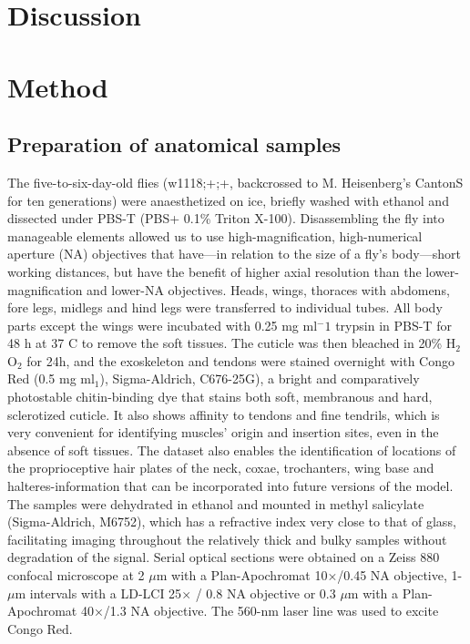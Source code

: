 \documentclass[sn-mathphys-num]{sn-jnl}%
\theoremstyle{thmstyleone}%
\theoremstyle{thmstyletwo}%
\theoremstyle{thmstylethree}%
\begin{document}
\section{Discussion}

\section{Method} \label{sec:method}

\subsection{Preparation of anatomical samples}

The five-to-six-day-old flies (w1118;+;+, backcrossed to M. Heisenberg's CantonS for ten generations) were anaesthetized on ice, briefly washed with ethanol and dissected under PBS-T (PBS+ 0.1\% Triton X-100).
Disassembling the fly into manageable elements allowed us to use high-magnification, high-numerical aperture (NA) objectives that have—in relation to the size of a fly’s body—short working distances, but have the benefit of higher axial resolution than the lower-magnification and lower-NA objectives. 
Heads, wings, thoraces with abdomens, fore legs, midlegs and hind legs were transferred to individual tubes.
All body parts except the wings 
were incubated with 0.25 mg ml$ ^-1 $ trypsin in PBS-T for 48 h at 37 C to remove the soft tissues.
The cuticle was then bleached in 20\% H$ _2 $O$ _2 $ for 24h, and the exoskeleton and tendons were stained overnight with Congo Red (0.5 mg ml$ _1 $), Sigma-Aldrich, C676-25G), a bright and comparatively photostable chitin-binding dye that stains both soft, membranous and hard, sclerotized cuticle.
It also shows affinity to tendons and fine tendrils, which is very convenient for identifying muscles' origin and insertion sites, even in the absence of soft tissues.
The dataset also enables the identification of locations of the proprioceptive hair plates of the neck, coxae, trochanters, wing base and halteres-information that can be incorporated into future versions of the model. 
The samples were dehydrated in ethanol and mounted in methyl salicylate (Sigma-Aldrich, M6752), which has a refractive index very close to that of glass, facilitating imaging throughout the relatively thick and bulky samples without degradation of the signal. 
Serial optical sections were obtained on a Zeiss 880 confocal microscope at 2 $ \mu $m with a Plan-Apochromat 10×/0.45 NA objective, 1-$ \mu $m intervals with a LD-LCI 25$ \times $ / 0.8 NA objective or 0.3 $ \mu $m with a Plan-Apochromat 40×/1.3 NA objective. The 560-nm laser line was used to excite Congo Red.
\end{document}

